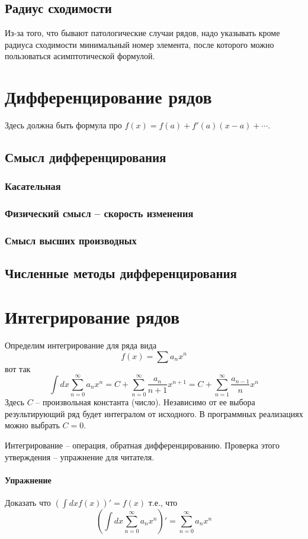 \documentclass{article}
\newenvironment{excercise}{\paragraph{Упражнение }}{}
\begin{document}
\subsection{Радиус сходимости}
Из-за того, что бывают патологические случаи рядов, надо указывать кроме радиуса сходимости минимальный номер элемента, после которого можно пользоваться асимптотической формулой.
\section{Дифференцирование рядов}
Здесь должна быть формула про $f(x)=f(a)+f'(a)(x-a)+\cdots$.
\subsection{Смысл дифференцирования}
\subsubsection{Касательная}
\subsubsection{Физический смысл -- скорость изменения}
\subsubsection{Смысл высших производных}
\subsection{Численные методы дифференцирования}
\section{Интегрирование рядов}

Определим интегрирование для ряда вида $$f(x) = \sum a_n x^n$$ вот так
\begin{equation}
\label{eq-integral}
\int dx \sum_{n=0}^{\infty} a_n x^n = C+\sum_{n=0}^{\infty} \frac{a_n}{n+1} x^{n+1} = C+\sum_{n=1}^{\infty}\frac{a_{n-1}}{n}x^n
\end{equation}
Здесь $C$ -- произвольная константа (число). Независимо от ее выбора результирующий ряд будет интегралом от исходного. В программных реализациях можно выбрать $C=0$.

Интегрирование -- операция, обратная дифференцированию. Проверка этого утверждения -- упражнение для читателя.
\begin{excercise}
Доказать что $(\int dx f(x))' = f(x)$ т.е., что
\begin{equation}
\label{eq-int-inverse}
(\int dx  \sum_{n=0}^{\infty} a_n x^n )' =  \sum_{n=0}^{\infty} a_n x^n
\end{equation}
\end{excercise}
\end{document}
